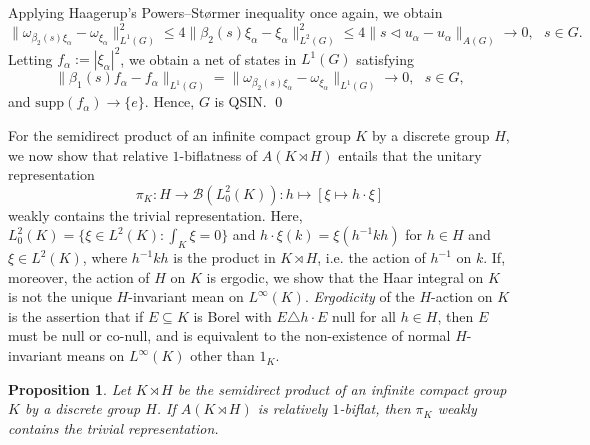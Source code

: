 \documentclass[preprint,12pt]{elsarticle}
\newtheorem{prop}[thm]{Proposition}
\newcommand{\LO}{L^1(G)}
\newcommand{\LT}{L^2(G)}
\newcommand{\om}{\omega}
\providecommand{\norm}[1]{\lVert#1\rVert}
\begin{document}
\begin{pf}
Applying Haagerup's Powers--St\o rmer inequality \cite[Lemma 2.10]{H} once again, we obtain
\begin{equation*}\norm{\om_{\beta_2(s)\xi_\alpha}-\om_{\xi_\alpha}}^2_{\LO}\leq 4\norm{\beta_2(s)\xi_\alpha-\xi_\alpha}^2_{\LT}\leq 4\norm{s\lhd u_\alpha-u_\alpha}_{A(G)}\rightarrow0, \ \ \ s\in G.\end{equation*}
Letting $f_\alpha:=|\xi_\alpha|^2$, we obtain a net of states in $\LO$ satisfying
$$\norm{\beta_1(s)f_\alpha - f_\alpha}_{\LO}=\norm{\om_{\beta_2(s)\xi_\alpha}-\om_{\xi_\alpha}}_{\LO}\rightarrow0, \ \ \ s\in G,$$
and $\mathrm{supp}(f_\alpha)\rightarrow\{e\}$. Hence, $G$ is QSIN.
\qed\end{pf}


For the semidirect product of an infinite compact group $K$ by a discrete group
$H$, we now show that relative $1$-biflatness of $A(K\rtimes H)$
entails that the unitary representation \[
\pi_{K}:H\rightarrow\mathcal{B}(L_0^2(K)):h\mapsto[\xi\mapsto h\cdot\xi]\]
weakly contains the trivial representation. Here, $L_0^2(K)=\{ \xi\in L^2(K):\int_{K}\xi=0\} $
and $h\cdot\xi(k)=\xi(h^{-1}kh)$
for $h\in H$ and $\xi\in L^2(K)$, where $h^{-1}kh$
is the product in $K\rtimes H$, i.e. the action of $h^{-1}$ on $k$.
If, moreover, the action of $H$ on $K$ is ergodic, we show that
the Haar integral on $K$ is not the unique $H$-invariant mean on
$L^{\infty}(K)$. \emph{Ergodicity} of the $H$-action
on $K$ is the assertion that if $E\subseteq K$ is Borel with $E\triangle h\cdot E$
null for all $h\in H$, then $E$ must be null or co-null, and is equivalent
to the non-existence of normal $H$-invariant means on $L^{\infty}(K)$
other than $1_{K}$.
\begin{prop}\label{p:semidirect}
Let $K\rtimes H$ be the semidirect product of an infinite compact group $K$
by a discrete group $H$. If $A(K\rtimes H)$ is relatively
$1$-biflat, then $\pi_{K}$ weakly contains the trivial representation.\end{prop}
\end{document}
